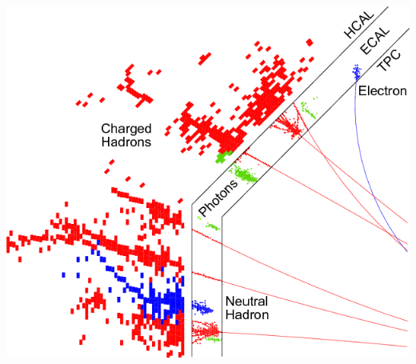 \documentclass[8pt]{beamer}
\begin{document}
\begin{frame}
\begin{minipage}{0.46\linewidth}
\begin{center}
        \includegraphics[width=0.95\linewidth]{pfa_event_display.png}
      \end{center}
    \end{minipage}
  \end{frame}
\end{document}
